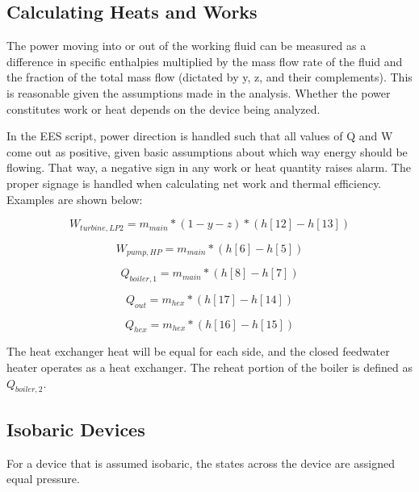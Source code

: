 \documentclass[10pt,cleanfoot]{asme2ej}
\begin{document}
\subsection{Calculating Heats and Works}

The power moving into or out of the working fluid can be measured as a difference in specific enthalpies multiplied by the mass flow rate of the fluid and the fraction of the total mass flow (dictated by y, z, and their complements). This is reasonable given the assumptions made in the analysis. Whether the power constitutes work or heat depends on the device being analyzed.

In the EES script, power direction is handled such that all values of Q and W come out as positive, given basic assumptions about which way energy should be flowing. That way, a negative sign in any work or heat quantity raises alarm. The proper signage is handled when calculating net work and thermal efficiency. Examples are shown below:

\begin{equation}
W_{turbine,LP2} = m_{main} * (1-y-z) * (h[12] - h[13])
\label{Turbine work out}
\end{equation}

\begin{equation}
W_{pump,HP} = m_{main} * (h[6] - h[5])
\label{Pump work in}
\end{equation}

\begin{equation}
Q_{boiler,1} = m_{main} * (h[8] - h[7])
\label{Boiler heat in}
\end{equation}

\begin{equation}
Q_{out} = m_{hex} * (h[17] - h[14])
\label{Condenser heat out}
\end{equation}

\begin{equation}
Q_{hex} = m_{hex} * (h[16] - h[15])
\label{Heat across exchangers}
\end{equation}

The heat exchanger heat will be equal for each side, and the closed feedwater heater operates as a heat exchanger. The reheat portion of the boiler is defined as $Q_{boiler,2}$.

\subsection{Isobaric Devices}

For a device that is assumed isobaric, the states across the device are assigned equal pressure.
\end{document}
